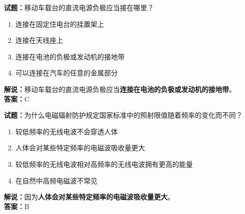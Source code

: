 \documentclass{ctexbook}
\begin{document}
\bigskip


\noindent\textbf{试题：}移动车载台的直流电源负极应当接在哪里？
\begin{enumerate}[leftmargin=3em]
	\item 连接在固定住电台的挂置架上
	\item 连接在天线座上
	\item 连接在电池的负极或发动机的接地带
	\item 可以连接在汽车的任意的金属部分
\end{enumerate}
\noindent\textbf{解说：}移动车载台的直流电源负极应当\textbf{连接在电池的负极或发动机的接地带}。\\
\textbf{答案：}C

\bigskip


\noindent\textbf{试题：}为什么电磁辐射防护规定国家标准中的照射限值随着频率的变化而不同？
\begin{enumerate}[leftmargin=3em]
	\item 较低频率的无线电波不会穿透人体
	\item 人体会对某些特定频率的电磁波吸收量更大
	\item 较低频率的无线电波相对高频率的无线电波拥有更高的能量
	\item 在自然中高频电磁波不常见
\end{enumerate}
\noindent\textbf{解说：}因为\textbf{人体会对某些特定频率的电磁波吸收量更大}。\\
\textbf{答案：}B






%
\end{document}
